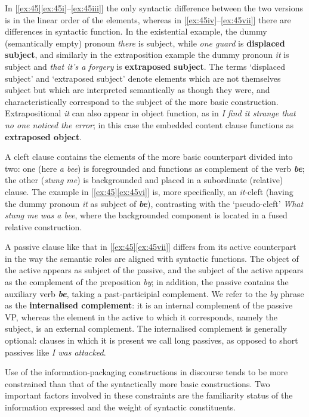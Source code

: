 In [\ref{ex:45}\ref{ex:45i}--\ref{ex:45iii}] the only syntactic difference between the two versions is in the linear order of the elements, whereas in [\ref{ex:45iv}--\ref{ex:45vii}] there are differences in syntactic function. In the existential example, the dummy (semantically empty) pronoun \textit{there} is subject, while \textit{one guard} is \textbf{displaced subject}, and similarly in the extraposition example the dummy pronoun \textit{it} is subject and \textit{that it's a forgery} is \textbf{extraposed subject}. The terms `displaced subject' and `extraposed subject' denote elements which are not themselves subject but which are interpreted semantically as though they were, and characteristically correspond to the subject of the more basic construction. Extrapositional \textit{it} can also appear in object function, as in \textit{I find it strange that no one noticed the error}; in this case the embedded content clause functions as \textbf{extraposed object}.

A {cleft} clause contains the elements of the more basic counterpart divided into two: one (here \textit{a bee}) is foregrounded and functions as complement of the verb \textit{\textbf{be}}; the other (\textit{stung me}) is backgrounded and placed in a subordinate (relative) clause. The example in [\ref{ex:45}\ref{ex:45vi}] is, more specifically, an {\textit{it}-cleft} (having the dummy pronoun \textit{it} as subject of \textit{\textbf{be}}), contrasting with the `{pseudo-cleft}' \textit{What stung me was a bee}, where the backgrounded component is located in a fused relative construction.

\newpage

A {passive} clause like that in [\ref{ex:45}\ref{ex:45vii}] differs from its active counterpart in the way the semantic roles are aligned with syntactic functions. The object of the active appears as subject of the passive, and the subject of the active appears as the complement of the preposition \textit{by}; in addition, the passive contains the auxiliary verb \textit{\textbf{be}}, taking a past-participial complement. We refer to the \textit{by} phrase as the \textbf{internalised complement}: it is an internal complement of the passive VP, whereas the element in the active to which it corresponds, namely the subject, is an external complement. The internalised complement is generally optional: clauses in which it is present we call {long passives}, as opposed to {short passives} like \textit{I was attacked}.

Use of the information-packaging constructions in discourse tends to be more constrained than that of the syntactically more basic constructions. Two important factors involved in these constraints are the familiarity status of the information expressed and the weight of syntactic constituents.

